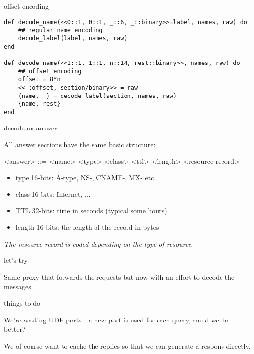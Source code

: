 \begin{frame}[fragile]{offset encoding}

\begin{verbatim}
def decode_name(<<0::1, 0::1, _::6, _::binary>>=label, names, raw) do
    ## regular name encoding
    decode_label(label, names, raw)
end
      
def decode_name(<<1::1, 1::1, n::14, rest::binary>>, names, raw) do
    ## offset encoding
    offset = 8*n
    <<_:offset, section/binary>> = raw
    {name, _} = decode_label(section, names, raw)
    {name, rest}
end
\end{verbatim}

\end{frame}

\begin{frame}[fragile]{decode an answer}

All answer sections have the same basic structure:

\begin{grammar}
<answer> ::= <name> <type> <class> <ttl> <length> <resource record>
\end{grammar}

\begin{itemize}
\item type 16-bits: A-type, NS-, CNAME-, MX- etc
\item class 16-bits: Internet, ...
\item TTL 32-bits: time in seconds (typical some hours)
\item length 16-bits: the length of the record in bytes
\end{itemize}

\vspace{10pt}\pause
{\em The resource record is coded depending on the type of resource.}

\end{frame}


\begin{frame}{let's try}

Same proxy that forwards the requests but now with an effort to decode the messages.

\end{frame}

\begin{frame}{things to do}

We're wasting UDP ports - a new port is used for each query, could we do better?

\vspace{20pt}\pause

We of course want to cache the replies so that we can generate a respons directly.



\end{frame}





